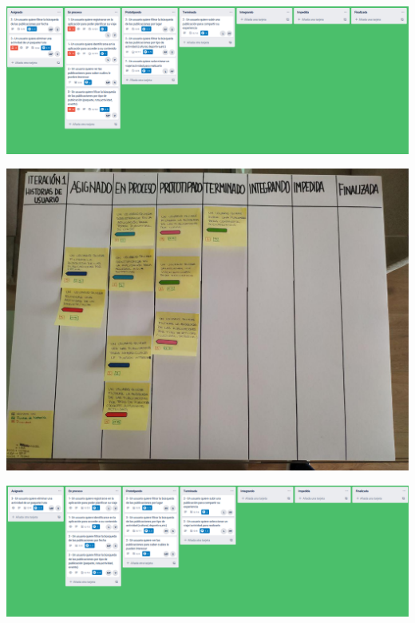 \documentclass[spanish]{beamer}
\begin{document}
\begin{frame}
	\begin{center}
		\includegraphics[scale=0.25]{trello1_6}
	\end{center}
\end{frame}

\begin{frame}
	\begin{center}
		\includegraphics[angle=0, scale=0.34]{papel1_6}
	\end{center}
\end{frame}

\begin{frame}
	\begin{center}
		\includegraphics[scale=0.25]{trello1_7}
	\end{center}
\end{frame}
\end{document}
